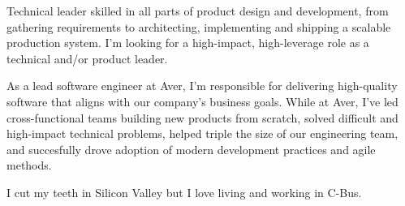 

\begin{cvparagraph}

Technical leader skilled in all parts of product design and development, from gathering requirements to architecting, implementing and shipping a scalable production system.
I'm looking for a high-impact, high-leverage role as a technical and/or product leader.

As a lead software engineer at Aver, I'm responsible for delivering high-quality software that aligns with our company's business goals.
While at Aver, I've led cross-functional teams building new products from scratch, solved difficult and high-impact technical problems, helped triple the size of our engineering team, and succesfully drove adoption of modern development practices and agile methods.

I cut my teeth in Silicon Valley but I love living and working in C-Bus.

\end{cvparagraph}

